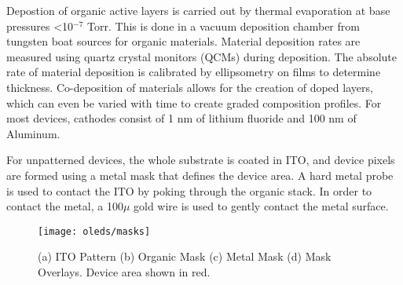 \documentclass[../thesis.tex]{subfiles}
\begin{document}

Depostion of organic active layers is carried out by thermal evaporation at base pressures <10$^{-7}$ Torr.  
This is done in a vacuum deposition chamber from tungsten boat sources for organic materials.
Material deposition rates are measured using quartz crystal monitors (QCMs) during deposition.
The absolute rate of material deposition is calibrated by ellipsometry on films to determine thickness.
Co-deposition of materials allows for the creation of doped layers, which can even be varied with time to create graded composition profiles.
For most devices, cathodes consist of 1 nm of lithium fluoride and 100 nm of Aluminum.

For unpatterned devices, the whole substrate is coated in ITO, and device pixels are formed using a metal mask that defines the device area.
A hard metal probe is used to contact the ITO by poking through the organic stack.
In order to contact the metal, a 100$\mu$ gold wire is used to gently contact the metal surface.

\begin{figure}[ht]
    \centering
    \texttt{[image: oleds/masks]}
    \caption{(a) ITO Pattern (b) Organic Mask (c) Metal Mask (d) Mask Overlays.  Device area shown in red.}
    \label{fig:oleds_masking}\par\vfill
\end{figure}
\end{document}
